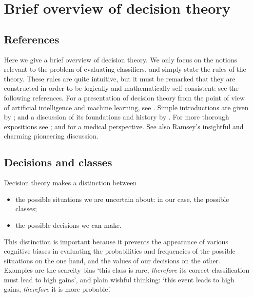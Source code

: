 \documentclass[\ifafour a4paper,12pt,\else a5paper,10pt,\fi%
onecolumn,oneside,article,%
british%
]{memoir}
\theoremstyle{remark}
\theoremstyle{innote}
\newcommand*{\wrench}{{\fontencoding{U}\fontfamily{fontawesomethree}\selectfont\symbol{114}}}
\newcommand{\mynotew}[1]{{\footnotesize\color{notecolour}\wrench\ #1}}
\renewcommand*{\|}[1][]{\nonscript\:#1\vert\nonscript\:\mathopen{}}
\newcommand*{\sect}{\S}%
\newcommand*{\chap}{ch.}%
\begin{document}




\section{Brief overview of decision theory}
\label{sec:decision_theory}

\subsection{References}
\label{sec:dt_refs}

Here we give a brief overview of decision theory. We only focus on the notions relevant to the problem of evaluating classifiers, and simply state the rules of the theory. These rules are quite intuitive, but it must be remarked that they are constructed in order to be logically and mathematically self-consistent: see the following references. For a presentation of decision theory from the point of view of artificial intelligence and machine learning, see \cite[\chap~15]{russelletal1995_r2022}. Simple introductions are given by \cites{north1968,raiffa1968_r1970,lindley1971_r1988}[\chap~8]{tribus1969}; and a discussion of its foundations and history by \cite{steeleetal2015_r2020}. For more thorough expositions see \cite{raiffaetal1961_r2000,fentonetal2019,berger1980_r1985,savage1954_r1972}; and \cite{soxetal1988_r2013,huninketal2001_r2014} for a medical perspective. See also Ramsey's \cite*{ramsey1926} insightful and charming pioneering discussion.

\subsection{Decisions and classes}
\label{sec:dt_dec_classes}

Decision theory makes a distinction between
\begin{itemize}
\item the possible situations we are uncertain about: in our case, the possible classes;
\item the possible decisions we can make.
\end{itemize}
This distinction is important because it prevents the appearance of various cognitive biases \autocites{kahnemanetal1982_r2008,gilovichetal2002_r2009,kahneman2011} in evaluating the probabilities and frequencies of the possible situations on the one hand, and the values of our decisions on the other. Examples are the scarcity bias\autocites{camereretal1989,kimetal1999,mittoneetal2009} \enquote*{this class is rare, \emph{therefore} its correct classification must lead to high gains}, and plain wishful thinking: \enquote*{this event leads to high gains, \emph{therefore} it is more probable}.
\end{document}
